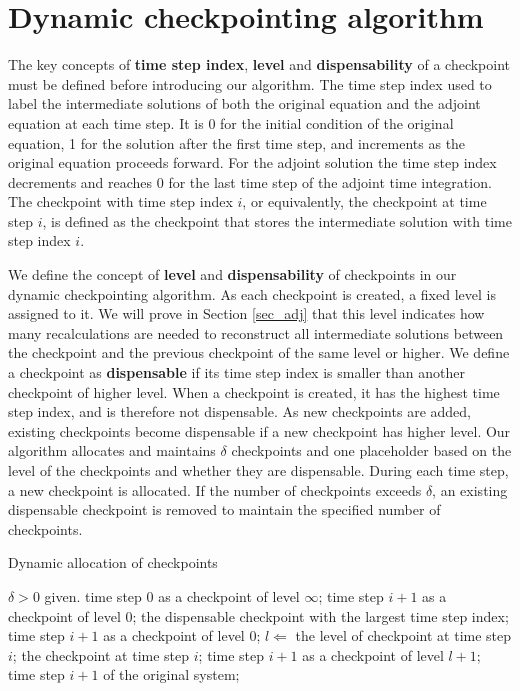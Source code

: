 \section{Dynamic checkpointing algorithm \label{sec_cp}}

The key concepts of {\bf time step index}, {\bf level} and {\bf dispensability}
of a checkpoint must be defined before introducing our algorithm.  The time
step index used to label the intermediate solutions of both the original
equation and the adjoint equation at each time step.  It is 0 for the initial
condition of the original equation, 1 for the solution after the first time
step, and increments as the original equation proceeds forward.  For the
adjoint solution the time step index decrements and reaches 0 for the last
time step of the adjoint time integration.  The checkpoint with time step index
$i$, or equivalently, the checkpoint at time step $i$, is defined as the
checkpoint that stores the intermediate solution with time step index $i$.

We define the concept of {\bf level} and {\bf dispensability} of checkpoints
in our dynamic checkpointing algorithm.  As each checkpoint is created,
a fixed level is assigned to it.  We will prove in Section \ref{sec_adj}
that this level indicates how many recalculations are needed to reconstruct
all intermediate solutions between the checkpoint and the previous checkpoint
of the same level or higher.  We define a checkpoint as {\bf dispensable} if
its time step index is smaller than another checkpoint of higher level.  When
a checkpoint is created, it has the highest time step index, and is therefore
not dispensable.  As new checkpoints are added, existing checkpoints become
dispensable if a new checkpoint has higher level.  Our algorithm allocates
and maintains $\delta$ checkpoints and one placeholder based on the level of
the checkpoints and whether they are dispensable.  During each time step, a new
checkpoint is allocated.  If the number of checkpoints exceeds $\delta$, an
existing dispensable checkpoint is removed to maintain the specified number of
checkpoints.

\begin{algorithm}
\caption{Dynamic allocation of checkpoints}
\label{alg1}
\begin{algorithmic}[indent=3em]
    \REQUIRE $\delta > 0$ given.
     time step 0 as a checkpoint of level $\infty$;
             time step $i + 1$ as a checkpoint of level 0;
             the dispensable checkpoint with the largest
                   time step index;
             time step $i + 1$ as a checkpoint of level 0;
        \ELSE
            \STATE $l \Leftarrow$ the level of checkpoint at time step $i$;
             the checkpoint at time step $i$;
             time step $i + 1$ as a checkpoint of level
                   $l + 1$;
        \ENDIF
         time step $i + 1$ of the original system;
    \ENDFOR
\end{algorithmic}
\end{algorithm}

